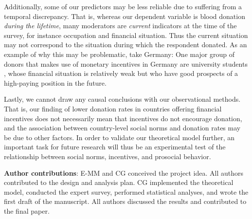 \documentclass[AER]{AEA}
\begin{document}


Additionally, some of our predictors may be less reliable due to suffering from a temporal discrepancy. That is, whereas our dependent variable is blood donation \textit{during the lifetime}, many moderators are \textit{current} indicators at the time of the survey, for instance occupation and financial situation. Thus the current situation may not correspond to the situation during which the respondent donated. As an example of why this may be problematic, take Germany: One major group of donors that makes use of monetary incentives in Germany are university students \citep{weidmann_blood_2013}, whose financial situation is relatively weak but who have good prospects of a high-paying position in the future.

Lastly, we cannot draw any causal conclusions with our observational methods. That is, our finding of lower donation rates in countries offering financial incentives does not necessarily mean that incentives do not encourage donation, and the association between country-level social norms and donation rates may be due to other factors. In order to validate our theoretical model further, an important task for future research will thus be an experimental test of the relationship between social norms, incentives, and prosocial behavior.

\vspace{1.5cm}

\textbf{Author contributions}: E-MM and CG conceived the project idea. All authors contributed to the design and analysis plan. CG implemented the theoretical model, conducted the expert survey, performed statistical analyses, and wrote the first draft of the manuscript. All authors discussed the results and contributed to the final paper.
\end{document}
